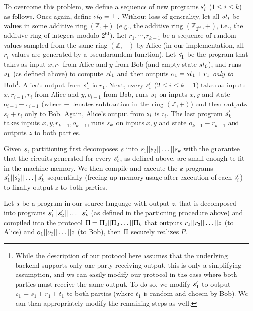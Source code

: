 To overcome this problem, we define a sequence of new programs
$s'_i$ ($1\leq i\leq k$) as follows. Once again, define $st_0
= \bot$. Without
loss of generality, let all $st_i$ be values in some additive ring
$(\mathbb{Z},+)$ (e.g., the additive ring $(\mathbb{Z}_{2^{64}},+)$,
i.e., the additive ring of integers modulo $2^{64}$).
Let $r_1,\cdots,r_{k-1}$ be a sequence of random values sampled from
the same ring $(\mathbb{Z},+)$ by Alice (in our implementation, all
$r_i$ values are generated by a pseudorandom function). Let $s'_1$
be the program that takes as input $x,r_1$ from Alice and $y$ from Bob
(and empty state $st_0$), and runs $s_1$ (as defined above) to
compute $st_1$ and then outputs $o_1 = st_1 + r_1$ {\em only
  to} Bob\footnote{While the description of our protocol here assumes
  that
  the underlying backend supports only one party receiving output,
  this is only a simplifying assumption, and we can easily modify our
  protocol in the case where both parties must receive the same
  output. To do so, we modify $s'_1$ to output $o_1 = s_1+r_1+t_1$ to
  both parties (where $t_1$ is random and chosen by Bob). We can then
  appropriately modify the remaining steps as well.}. Alice's output
from $s'_1$ is $r_1$. Next, every $s'_i$ ($2\leq i\leq k-1$)
takes as inputs $x,r_{i-1},r_i$ from Alice and $y,o_{i-1}$ from Bob,
runs $s_i$
on inputs $x,y$ and state $o_{i-1}-r_{i-1}$ (where $-$ denotes
subtraction in the ring $(\mathbb{Z},+)$) and then outputs $s_i+r_i$
only to Bob. Again, Alice's output from $s_i$ is $r_i$. The last
program $s'_k$ takes inputs $x,y,r_{k-1},o_{k-1}$, runs $s_k$
on inputs $x,y$ and state $o_{k-1}-r_{k-1}$ and outputs $z$ to both
parties.

Given $s$, partitioning first decomposes $s$ into
$s_1||s_2||\dots||s_k$ with the guarantee that the
circuits generated for every $s'_i$, as defined above, are small
enough to fit in the machine memory. We then compile and execute the
$k$ programs $s'_1||s'_2||\dots||s'_k$ sequentially
(freeing up memory usage after execution of each $s'_i$) to
finally output $z$ to both parties.

\begin{theorem}
Let $s$ be a program in our source language with output $z$, that
is decomposed into programs
$s'_1||s'_2||\dots||s'_k$ (as defined in
the partioning procedure above) and compiled into the protocol $\Pi
= \Pi_1||\Pi_2\dots||\Pi_k$ that outputs $r_1||
r_2||\dots|| z$
(to Alice) and $o_1|| o_2||\dots||z$ (to Bob), then $\Pi$ securely
realizes $P$.
\end{theorem}

